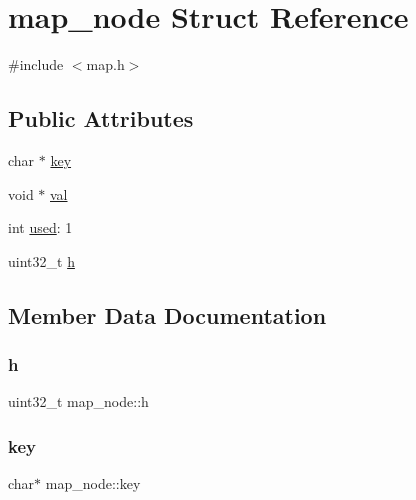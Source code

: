 \hypertarget{structmap__node}{}\section{map\+\_\+node Struct Reference}
\label{structmap__node}


{\ttfamily \#include $<$map.\+h$>$}

\subsection*{Public Attributes}
\begin{DoxyCompactItemize}
\item 
char $\ast$ \hyperlink{structmap__node_a7f78daf7b510166b7d2c0d15c0f155d8}{key}
\item 
void $\ast$ \hyperlink{structmap__node_a1d4251143de664ac95bbeb48d0323f1b}{val}
\item 
int \hyperlink{structmap__node_a879076d62a4f4f9deb75feffc6fd1940}{used}\+: 1
\item 
uint32\+\_\+t \hyperlink{structmap__node_a1cf8a340a58c73cb61b837208417a09d}{h}
\end{DoxyCompactItemize}


\subsection{Member Data Documentation}
\mbox{\label{structmap__node_a1cf8a340a58c73cb61b837208417a09d}} 
\subsubsection{\texorpdfstring{h}{h}}
{\footnotesize\ttfamily uint32\+\_\+t map\+\_\+node\+::h}

\mbox{\label{structmap__node_a7f78daf7b510166b7d2c0d15c0f155d8}} 
\subsubsection{\texorpdfstring{key}{key}}
{\footnotesize\ttfamily char$\ast$ map\+\_\+node\+::key}

\mbox{\label{structmap__node_a879076d62a4f4f9deb75feffc6fd1940}} 
